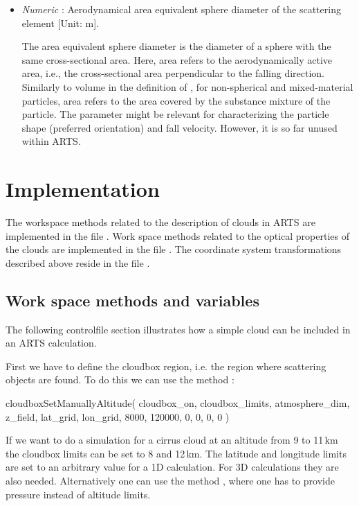 \begin{itemize}

\item  {\sl Numeric} :
  Aerodynamical area equivalent sphere diameter of the scattering element [Unit: m].

  The area equivalent sphere diameter is the diameter of a sphere with the same
  cross-sectional area. Here, area refers to the aerodynamically active area,
  i.e., the cross-sectional area perpendicular to the falling direction.
  Similarly to volume in the definition of , for
  non-spherical and mixed-material particles, area refers to the area covered by
  the substance mixture of the particle.
  The parameter might be relevant for characterizing the particle shape
  (preferred orientation) and fall velocity. However, it is so far unused within
  ARTS.
\end{itemize}


\section{Implementation}
\label{sec:clouds:implement}

The workspace methods related to the description of clouds in ARTS are
implemented in the file .
Work space methods related to the optical properties of the clouds are
implemented in the file . The coordinate system
transformations described above reside in the file
.

\subsection{Work space methods and variables}

The following controlfile section illustrates how a simple cloud can
be included in an ARTS calculation. 

First we have to define the cloudbox region, i.e. the region where
scattering objects are found. To do this we can use the method
:
\begin{code}
cloudboxSetManuallyAltitude( cloudbox_on, cloudbox_limits,
                             atmosphere_dim, z_field,
                             lat_grid, lon_grid,
                             8000, 120000,
                             0, 0, 0, 0 )
\end{code}
If we want to do a simulation for a
cirrus cloud at an altitude from 9 to 11\,km the cloudbox limits can
be set to 8 and 12\,km. The latitude and longitude limits are set to
an arbitrary value for a 1D calculation. For 3D calculations they are
also needed. Alternatively one can use the method
, where one has to provide pressure
instead of altitude limits. 
 
